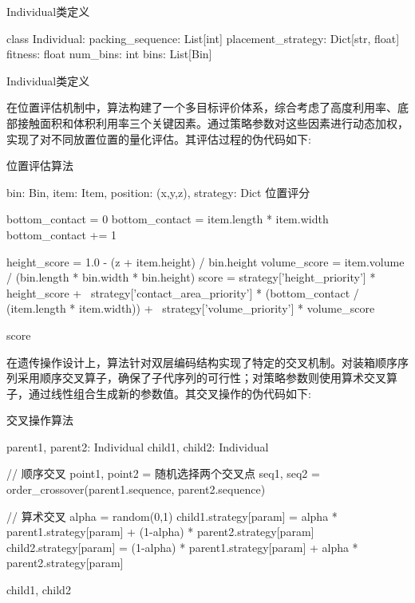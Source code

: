 \documentclass[UTF8]{ctexart}
\begin{document}
\begin{algorithm}[!h]
\caption{Individual类定义}
\begin{algorithmic}[1]

\STATE class Individual:
\STATE \quad packing\_sequence: List[int] 
\STATE \quad placement\_strategy: Dict[str, float] 
\STATE \quad fitness: float 
\STATE \quad num\_bins: int 
\STATE \quad bins: List[Bin] 

\RETURN Individual类定义
\end{algorithmic}
\end{algorithm}

在位置评估机制中，算法构建了一个多目标评价体系，综合考虑了高度利用率、底部接触面积和体积利用率三个关键因素。通过策略参数对这些因素进行动态加权，实现了对不同放置位置的量化评估。其评估过程的伪代码如下:

\begin{algorithm}[!h]
\caption{位置评估算法}
\begin{algorithmic}[1]
\REQUIRE bin: Bin, item: Item, position: (x,y,z), strategy: Dict
\ENSURE 位置评分

\STATE bottom\_contact = 0
    \STATE bottom\_contact = item.length * item.width
\ELSE
                \STATE bottom\_contact += 1
            \ENDIF
        \ENDFOR
    \ENDFOR
\ENDIF

\STATE height\_score = 1.0 - (z + item.height) / bin.height
\STATE volume\_score = item.volume / (bin.length * bin.width * bin.height)
\STATE score = strategy['height\_priority'] * height\_score + \
               strategy['contact\_area\_priority'] * (bottom\_contact / (item.length * item.width)) + \
               strategy['volume\_priority'] * volume\_score

\RETURN score
\end{algorithmic}
\end{algorithm}

在遗传操作设计上，算法针对双层编码结构实现了特定的交叉机制。对装箱顺序序列采用顺序交叉算子，确保了子代序列的可行性；对策略参数则使用算术交叉算子，通过线性组合生成新的参数值。其交叉操作的伪代码如下:

\begin{algorithm}[!h]
\caption{交叉操作算法}
\begin{algorithmic}[1]
\REQUIRE parent1, parent2: Individual
\ENSURE child1, child2: Individual

\STATE // 顺序交叉
\STATE point1, point2 = 随机选择两个交叉点
\STATE seq1, seq2 = order\_crossover(parent1.sequence, parent2.sequence)

\STATE // 算术交叉
\STATE alpha = random(0,1)
    \STATE child1.strategy[param] = alpha * parent1.strategy[param] + (1-alpha) * parent2.strategy[param]
    \STATE child2.strategy[param] = (1-alpha) * parent1.strategy[param] + alpha * parent2.strategy[param]
\ENDFOR

\RETURN child1, child2
\end{algorithmic}
\end{algorithm}
\end{document}
